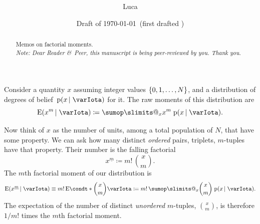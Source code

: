 \documentclass[\ifafour a4paper,12pt,\else a5paper,10pt,\fi%
onecolumn,oneside,article,%
british%
]{memoir}
\title{\propertitle%
}
\author{%
\hspace*{\stretch{1}}%
\parbox{0.5\linewidth}%
{\protect\centering Luca %
\footnotesize\epost{\email{piero.mana}{ntnu.no}}}%
\hspace*{\stretch{1}}%
}
\date{Draft of \today\ (first drafted \firstdraft)}
\makeatletter
\theoremstyle{remark}
\theoremstyle{innote}
\def\sum{\DOTSI\sumop\slimits@}
\newcommand*{\amp}{\&}
\newcommand*{\asudedication}[1]{%
{\par\centering\textit{#1}\par}}
\newcommand*{\defd}{\coloneqq}
\DeclarePairedDelimiter\set{\{}{\}}
\newcommand*{\pf}{\mathrm{p}}%
\newcommand*{\E}{\mathrm{E}}
\renewcommand*{\|}{\nonscript\,\vert\nonscript\;\mathopen{}}
\newcommand*{\dobs}{degrees of belief}
\newcommand*{\yI}{\varIota}
\makeatother
\begin{document}
\captiondelim{\quad}\captionnamefont{\footnotesize}\captiontitlefont{\footnotesize}
\frenchspacing

\maketitle
\abstractrunin
\abslabeldelim{}
\renewcommand*{\abstractname}{}
\setlength{\absleftindent}{0pt}
\setlength{\absrightindent}{0pt}
\setlength{\abstitleskip}{-\absparindent}
\begin{abstract}%
  \noindent Memos on factorial moments.
\\\noindent\emph{\footnotesize Note: Dear Reader
    \amp\ Peer, this manuscript is being peer-reviewed by you. Thank you.}
\end{abstract}

\frenchspacing


\bigskip

Consider a quantity $x$ assuming integer values $\set{0,1,\dotsc,N}$, and a
distribution of \dobs\ $\pf(x \| \yI)$ for it. The raw moments of this
distribution are
\begin{equation}
  \label{eq:raw_moments}
\E(x^m \| \yI) \defd  \sum_x x^m\;\pf(x \| \yI).
\end{equation}

Now think of $x$ as the number of units, among a total population of $N$,
that have some property. We can ask how many distinct \emph{ordered} pairs,
triplets, $m$-tuples have that property. Their number is the falling
factorial
\begin{equation}
  \label{eq:falling_factorial}
  x^{\underline{m}} \defd m!\,\binom{x}{m}.
\end{equation}
The $m$th factorial moment of our distribution is
\begin{equation}
  \label{eq:factorial_moments}
  \E(x^{\underline{m}} \| \yI) \equiv
  m!\,\E\condt*{\binom{x}{m}}{\yI} 
  \defd  m!\,\sum_x \binom{x}{m}\;\pf(x \| \yI).
\end{equation}
The expectation of the number of distinct \emph{unordered} $m$-tuples,
$\binom{x}{m}$, is therefore $1/m!$ times the $m$th factorial moment.
\end{document}
